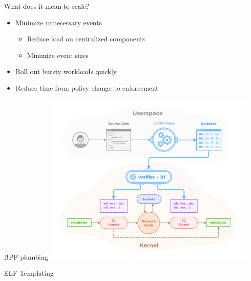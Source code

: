 \documentclass[black,white]{beamer}
\DeclareRobustCommand{\#}{\adjustbox{valign=B,totalheight=.57\baselineskip}{\oldhash}}%
\begin{document}
    \begin{frame}{What does it mean to scale?}
        \begin{itemize}
            \item Minimize unnecessary events \smallskip
            \begin{itemize}
                \item Reduce load on centralized components \medskip
                \item Minimize event sizes \medskip
            \end{itemize}
            \item Roll out bursty workloads quickly \medskip
            \item Reduce time from policy change to enforcement \medskip
        \end{itemize}
    \end{frame}

    \begin{frame}{BPF plumbing}
        \centering
        \includegraphics[width=0.8\textwidth,keepaspectratio]{bpf-verifier.png}
    \end{frame}


    \begin{frame}{ELF Templating}
        \centering
        
    \end{frame}
\end{document}
